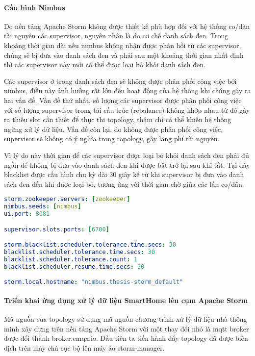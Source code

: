\paragraph{Cấu hình Nimbus}

Do nền tảng Apache Storm không được thiết kế phù hợp đối với hệ thống co/dãn tài nguyên các supervisor, nguyên nhân là do cơ chế danh sách đen. Trong khoảng thời gian dài nếu nimbus không nhận được phản hồi từ các supervisor, chúng sẽ bị đưa vào danh sách đen và phải sau một khoảng thời gian nhất định thì các supervisor này mới có thể được loại bỏ khỏi danh sách đen.

Các supervisor ở trong danh sách đen sẽ không được phân phối công việc bởi nimbus, điều này ảnh hưởng rất lớn đến hoạt động của hệ thống khi chúng gây ra hai vấn đề. Vấn đề thứ nhất, số lượng các supervisor được phân phối công việc với số lượng supervisor trong tái cấu trúc (rebalance) không khớp nhau từ đó gây ra thiếu slot cần thiết để thực thi topology, thậm chí có thể khiến hệ thống ngừng xử lý dữ liệu. Vấn đề còn lại, do không được phân phối công việc, supervisor sẽ không có ý nghĩa trong topology, gây lãng phí tài nguyên.

Vì lý do này thời gian để các supervisor được loại bỏ khỏi danh sách đen phải đủ ngắn để không bị đưa vào danh sách đen khi được bật trở lại sau khi tắt. Tại đây blacklist được cấu hình chu kỳ dài 30 giây kể từ khi supervisor bị đưa vào danh sách đen đến khi được loại bỏ, tương ứng với thời gian chờ giữa các lần co/dãn.

\begin{lstlisting}[language=yaml, caption={Cấu hình Nimbus node}]
storm.zookeeper.servers: [zookeeper]
nimbus.seeds: [nimbus]
ui.port: 8081

supervisor.slots.ports: [6700]

storm.blacklist.scheduler.tolerance.time.secs: 30
blacklist.scheduler.tolerance.time.secs: 30
blacklist.scheduler.tolerance.count: 1
blacklist.scheduler.resume.time.secs: 30

storm.local.hostname: "nimbus.thesis-storm_default"
\end{lstlisting}

\paragraph{Triển khai ứng dụng xử lý dữ liệu SmartHome lên cụm Apache Storm}

Mã nguồn của topology sử dụng mã nguồn chương trình xử lý dữ liệu nhà thông minh xây dựng trên nền tảng Apache Storm \autocite{fimocodestormsmarthome} với một thay đổi nhỏ là \gls{mqtt} broker được đổi thành broker.emqx.io. Đầu tiên ta tiến hành đẩy topology đã được biên dịch trên máy chủ cục bộ lên máy ảo storm-manager.

